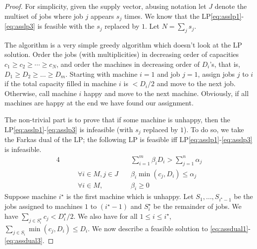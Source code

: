 \begin{proof}
For simplicity, given the supply vector, abusing notation let $J$ denote the multiset of jobs where job $j$ appears $s_j$ times. We know that the LP\eqref{eq:asslp1}-\eqref{eq:asslp3} is feasible with the $s_j$ replaced by $1$. Let $N = \sum_j s_j$. 

The algorithm is a  very simple greedy algorithm which doesn't look at the LP solution.  Order the jobs (with multiplicities) in decreasing order of capacities $c_1\geq c_2 \geq \cdots \geq c_N$, and order the machines in decreasing order of $D_i$'s, that is, $D_1 \geq D_2 \geq \ldots \geq D_m$. 
Starting with machine $i=1$ and job $j=1$, assign jobs $j$ to $i$ if the total capacity filled in machine $i$ is $< D_i/2$ and move to the next job. Otherwise, call machine $i$ happy and move to the next machine. Obviously, if all machines are happy at the end we have found our assignment. 

The non-trivial part is to  prove that if some machine is unhappy, then the LP\eqref{eq:asslp1}-\eqref{eq:asslp3} is infeasible (with $s_j$ replaced by $1$).
To do so, we take the Farkas dual of the LP; the following LP is feasible iff LP\eqref{eq:asslp1}-\eqref{eq:asslp3} is infeasible.
	\begin{alignat}{4}
		&&   & \quad \textstyle \sum_{i=1}^m \beta_i D_i > \sum_{j=1}^n\alpha_j \label{eq:assdual1}   \\
		&& \quad \forall i\in M,j\in J & \quad \textstyle \beta_i\min(c_j,D_i) \leq \alpha_j \label{eq:assdual2}  \\
		&& \quad \forall i\in M, &\quad  \beta_i \geq 0\label{eq:assdual3}
	\end{alignat}
	\def\i{i^\star}
Suppose machine $\i$ is the first machine which is unhappy. Let $S_1,\ldots,S_{\i-1}$ be the jobs assigned to machines $1$ to $(\i-1)$ and $S_\i$ be the remainder of jobs. 
We have $\sum_{j\in S_\i} c_j < D_\i/2$. We also have for all $1\leq i\leq \i$, $\sum_{j\in S_i} \min(c_j,D_i) \leq D_i$.
We now describe a feasible solution to \eqref{eq:assdual1}-\eqref{eq:assdual3}.


\end{proof}
